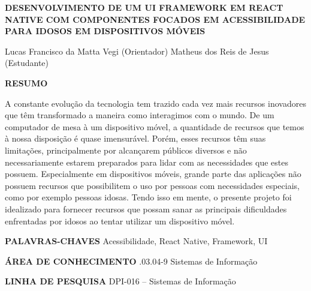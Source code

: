 \documentclass[
	12pt,				    %
	openright,			    %
	oneside,			    %
	a4paper,			    %
    sumario=tradicional,    %
	english,			    %
	brazil,				    %
	]{abntex2}              %
\begin{document}
\begin{resumo}
	\noindent

	\MakeUppercase{\textbf{Desenvolvimento de um UI Framework em React Native com componentes focados em acessibilidade para idosos em dispositivos móveis}}

	\vspace{\onelineskip}
	Lucas Francisco da Matta Vegi (Orientador) \newline
	Matheus dos Reis de Jesus (Estudante)
	\vspace{\onelineskip}

	\MakeUppercase{\textbf{Resumo}}

	A constante evolução da tecnologia tem trazido cada vez mais recursos inovadores que têm transformado a maneira como interagimos com o mundo. De um computador de mesa à um dispositivo móvel, a quantidade de recursos que temos à nossa disposição é quase imensurável. Porém, esses recursos têm suas limitações, principalmente por alcançarem públicos diversos e não necessariamente estarem preparados para lidar com as necessidades que estes possuem. Especialmente em dispositivos móveis, grande parte das aplicações não possuem recursos que possibilitem o uso por pessoas com necessidades especiais, como por exemplo pessoas idosas. Tendo isso em mente, o presente projeto foi idealizado para fornecer recursos que possam sanar as principais dificuldades enfrentadas por idosos ao tentar utilizar um dispositivo móvel.

	\vspace{\onelineskip}

	\noindent
	\MakeUppercase{\textbf{Palavras-chaves}} \newline
	Acessibilidade, React Native, Framework, UI
	\vspace{\onelineskip}

	\noindent
	\MakeUppercase{\textbf{Área de Conhecimento}} .03.04-9 Sistemas de Informação
	\vspace{\onelineskip}

	\noindent
	\MakeUppercase{\textbf{Linha de Pesquisa}} \newline
	DPI-016 – Sistemas de Informação
\end{resumo}

%
%
\end{document}
